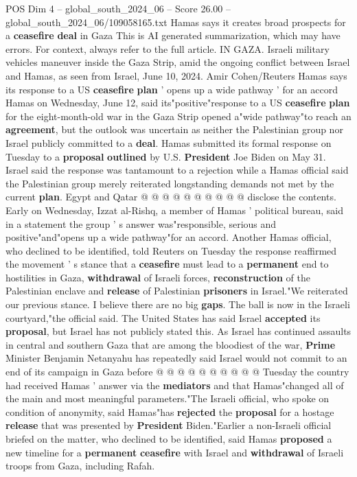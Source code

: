 \begin{textsample}{POS Dim 4 – global\_south\_2024\_06 – Score 26.00 – global\_south\_2024\_06/109058165.txt}  \label{ex:f4_pos_082}
Hamas says it creates broad prospects for a \textbf{ceasefire} \textbf{deal} in Gaza This is AI generated summarization, which may have errors.
For context, always refer to the full article.
IN GAZA.
Israeli military vehicles maneuver inside the Gaza Strip, amid the ongoing conflict between Israel and Hamas, as seen from Israel, June 10, 2024.
Amir Cohen/Reuters Hamas says its response to a US \textbf{ceasefire} \textbf{plan} ' opens up a wide pathway ' for an accord Hamas on Wednesday, June 12, said its"positive"response to a US \textbf{ceasefire} \textbf{plan} for the eight-month-old war in the Gaza Strip opened a"wide pathway"to reach an \textbf{agreement}, but the outlook was uncertain as neither the Palestinian group nor Israel publicly committed to a \textbf{deal}.
Hamas submitted its formal response on Tuesday to a \textbf{proposal} \textbf{outlined} by U.S. \textbf{President} Joe Biden on May 31.
Israel said the response was tantamount to a rejection while a Hamas official said the Palestinian group merely reiterated longstanding demands not met by the current \textbf{plan}.
Egypt and Qatar @ @ @ @ @ @ @ @ @ @ disclose the contents.
Early on Wednesday, Izzat al-Rishq, a member of Hamas ' political bureau, said in a statement the group ' s answer was"responsible, serious and positive"and"opens up a wide pathway"for an accord.
Another Hamas official, who declined to be identified, told Reuters on Tuesday the response reaffirmed the movement ' s stance that a \textbf{ceasefire} must lead to a \textbf{permanent} end to hostilities in Gaza, \textbf{withdrawal} of Israeli forces, \textbf{reconstruction} of the Palestinian enclave and \textbf{release} of Palestinian \textbf{prisoners} in Israel."We reiterated our previous stance.
I believe there are no big \textbf{gaps}.
The ball is now in the Israeli courtyard,"the official said.
The United States has said Israel \textbf{accepted} its \textbf{proposal}, but Israel has not publicly stated this.
As Israel has continued assaults in central and southern Gaza that are among the bloodiest of the war, \textbf{Prime} Minister Benjamin Netanyahu has repeatedly said Israel would not commit to an end of its campaign in Gaza before @ @ @ @ @ @ @ @ @ @ Tuesday the country had received Hamas ' answer via the \textbf{mediators} and that Hamas"changed all of the main and most meaningful parameters."The Israeli official, who spoke on condition of anonymity, said Hamas"has \textbf{rejected} the \textbf{proposal} for a hostage \textbf{release} that was presented by \textbf{President} Biden."Earlier a non-Israeli official briefed on the matter, who declined to be identified, said Hamas \textbf{proposed} a new timeline for a \textbf{permanent} \textbf{ceasefire} with Israel and \textbf{withdrawal} of Israeli troops from Gaza, including Rafah.

\end{textsample}
